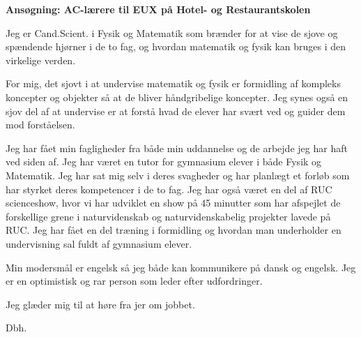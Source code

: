\documentclass[10pt,a4paper]{letter}
\begin{document}
\begin{letter}{}
\opening{\textbf{Ansøgning: AC-lærere til EUX på Hotel- og Restaurantskolen}}

Jeg er Cand.Scient. i Fysik og Matematik som brænder for at vise de sjove og spændende hjørner i de to fag, og hvordan matematik og fysik kan bruges i den virkelige verden. 

For mig, det sjovt i at undervise matematik og fysik er formidling af kompleks koncepter og objekter så at de bliver håndgribelige koncepter. Jeg synes også en sjov del af at undervise er at forstå hvad de elever har svært ved og guider dem mod forståelsen.

Jeg har fået min fagligheder fra både min uddannelse og de arbejde jeg har haft ved siden af. Jeg har været en tutor for gymnasium elever i både Fysik og Matematik. Jeg har sat mig selv i deres svagheder og har planlægt et forløb som har styrket deres kompetencer i de to fag. Jeg har også været en del af RUC scienceshow, hvor vi har udviklet en show på 45 minutter som har afspejlet de forskellige grene i naturvidenskab og naturvidenskabelig projekter lavede på RUC. Jeg har fået en del træning i formidling og hvordan man underholder en undervisning sal fuldt af gymnasium elever. 

Min modersmål er engelsk så jeg både kan kommunikere på dansk og engelsk. Jeg er en optimistisk og rar person som leder efter udfordringer.  

Jeg glæder mig til at høre fra jer om jobbet.  

\closing{Dbh.}

\end{letter}

\end{document}
